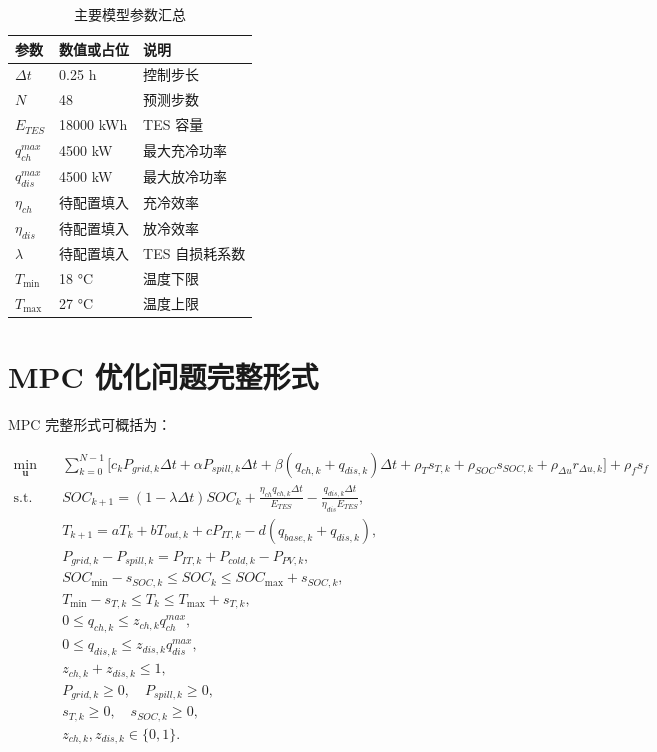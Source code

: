 \documentclass[UTF8,a4paper,12pt]{ctexrep}
\begin{document}
\begin{table}[htbp]
  \centering
  \caption{主要模型参数汇总}
  \begin{tabular}{lll}
    \toprule
    参数 & 数值或占位 & 说明 \\
    \midrule
    $\Delta t$ & 0.25 h & 控制步长 \\
    $N$ & 48 & 预测步数 \\
    $E_{TES}$ & 18000 kWh & TES 容量 \\
    $q_{ch}^{max}$ & 4500 kW & 最大充冷功率 \\
    $q_{dis}^{max}$ & 4500 kW & 最大放冷功率 \\
    $\eta_{ch}$ & 待配置填入 & 充冷效率 \\
    $\eta_{dis}$ & 待配置填入 & 放冷效率 \\
    $\lambda$ & 待配置填入 & TES 自损耗系数 \\
    $T_{\min}$ & 18 \si{\degreeCelsius} & 温度下限 \\
    $T_{\max}$ & 27 \si{\degreeCelsius} & 温度上限 \\
    \bottomrule
  \end{tabular}
\end{table}

\chapter{MPC 优化问题完整形式}

MPC 完整形式可概括为：

\begin{align}
  \min_{\mathbf{u}} \quad
  & \sum_{k=0}^{N-1}
  \Big[
    c_k P_{grid,k}\Delta t
    + \alpha P_{spill,k}\Delta t
    + \beta(q_{ch,k}+q_{dis,k})\Delta t
    + \rho_T s_{T,k}
    + \rho_{SOC}s_{SOC,k}
    + \rho_{\Delta u} r_{\Delta u,k}
  \Big] + \rho_f s_f \\
  \text{s.t.}\quad
  & SOC_{k+1}
  =
  (1-\lambda \Delta t)SOC_k
  + \frac{\eta_{ch} q_{ch,k}\Delta t}{E_{TES}}
  - \frac{q_{dis,k}\Delta t}{\eta_{dis}E_{TES}}, \\
  & T_{k+1}
  =
  aT_k
  + bT_{out,k}
  + cP_{IT,k}
  - d(q_{base,k}+q_{dis,k}), \\
  & P_{grid,k} - P_{spill,k}
  =
  P_{IT,k}
  + P_{cold,k}
  - P_{PV,k}, \\
  & SOC_{\min}-s_{SOC,k} \leq SOC_k \leq SOC_{\max}+s_{SOC,k}, \\
  & T_{\min}-s_{T,k} \leq T_k \leq T_{\max}+s_{T,k}, \\
  & 0 \leq q_{ch,k} \leq z_{ch,k}q_{ch}^{max}, \\
  & 0 \leq q_{dis,k} \leq z_{dis,k}q_{dis}^{max}, \\
  & z_{ch,k}+z_{dis,k}\leq 1, \\
  & P_{grid,k}\geq 0,\quad P_{spill,k}\geq 0, \\
  & s_{T,k}\geq 0,\quad s_{SOC,k}\geq 0, \\
  & z_{ch,k},z_{dis,k}\in\{0,1\}.
\end{align}
\end{document}
